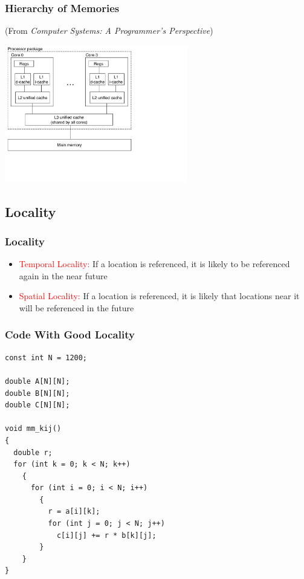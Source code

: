 \documentclass{beamer}
\begin{document}
\begin{frame}[fragile]
\frametitle{Hierarchy of Memories}
\tiny
(From \emph{Computer Systems: A Programmer's Perspective})

\begin{center}
\includegraphics[width=8cm]{corei7caches.pdf}
\end{center}

\end{frame}

\subsection{Locality}

\begin{frame}%
\frametitle{Locality}

\begin{itemize}

\item \textcolor{red}{Temporal Locality:} If a location is referenced, it is likely to be referenced again in
  the near future

\vspace{0.75cm}

\item \textcolor{red}{Spatial Locality:} If a location is referenced, it is likely that locations near it will
  be referenced in the future

\end{itemize}

\end{frame}

\begin{frame}[fragile]
\frametitle{Code With Good Locality}

\scriptsize

\begin{lstlisting}[linebackgroundcolor={\lstcolorlines{16}}]
const int N = 1200;

double A[N][N];
double B[N][N];
double C[N][N];

void mm_kij()
{
  double r;
  for (int k = 0; k < N; k++)
    {
      for (int i = 0; i < N; i++)
        {
          r = a[i][k];
          for (int j = 0; j < N; j++)
            c[i][j] += r * b[k][j];
        }
    }
}
\end{lstlisting}


\end{frame}
\end{document}
